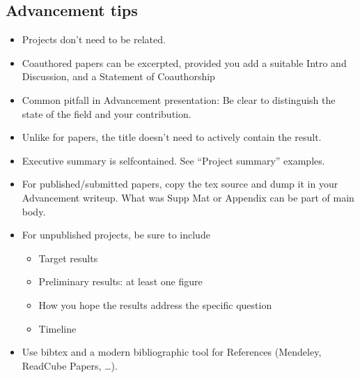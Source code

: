 \documentclass[letterpaper,10pt,english]{sphinxmanual}
\let\sphinxpxdimen\pdfpxdimen\else\newdimen\sphinxpxdimen
\begin{document}
\subsection{Advancement tips}
\label{\detokenize{04WhatIsAPhD:advancement-tips}}\begin{itemize}
\item {} 
\sphinxAtStartPar
Projects don’t need to be related.

\item {} 
\sphinxAtStartPar
Co\sphinxhyphen{}authored papers can be excerpted, provided you add a suitable Intro and Discussion, and a Statement of Co\sphinxhyphen{}authorship

\item {} 
\sphinxAtStartPar
Common pitfall in Advancement presentation: Be clear to distinguish the state of the field and your contribution.

\item {} 
\sphinxAtStartPar
Unlike for papers, the title doesn’t need to actively contain the result.

\item {} 
\sphinxAtStartPar
Executive summary is self\sphinxhyphen{}contained. See “Project summary” examples.

\item {} 
\sphinxAtStartPar
For published/submitted papers, copy the tex source and dump it in your Advancement write\sphinxhyphen{}up. What was Supp Mat or Appendix can be part of main body.

\item {} 
\sphinxAtStartPar
For unpublished projects, be sure to include
\begin{itemize}
\item {} 
\sphinxAtStartPar
Target results

\item {} 
\sphinxAtStartPar
Preliminary results: at least one figure

\item {} 
\sphinxAtStartPar
How you hope the results address the specific question

\item {} 
\sphinxAtStartPar
Timeline

\end{itemize}

\end{itemize}

\noindent\sphinxincludegraphics[width=600\sphinxpxdimen]{{figTimeline}.pdf}
\begin{itemize}
\item {} 
\sphinxAtStartPar
Use bibtex and a modern bibliographic tool for References (Mendeley, ReadCube Papers, …).

\end{itemize}
\end{document}
